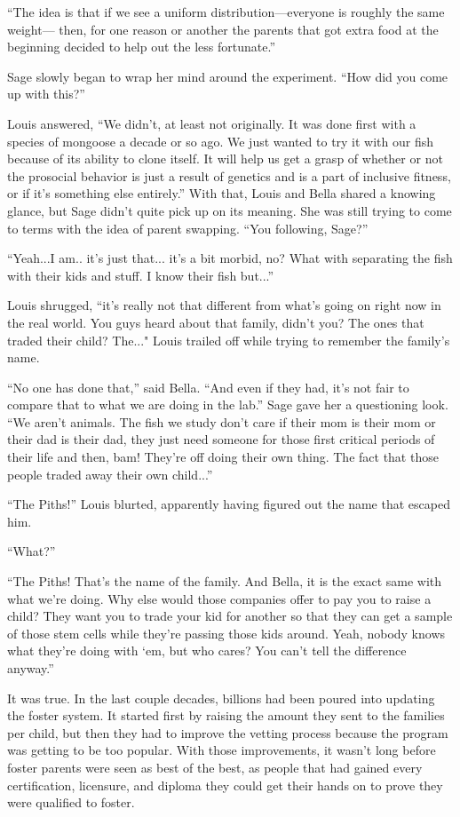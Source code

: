 \documentclass[12pt, fleqn, AofM.tex]{subfiles}
\begin{document}
“The idea is that if we see a uniform distribution—everyone is roughly the same weight— then, for one reason or another the parents that got extra food at the beginning decided to help out the less fortunate.”

Sage slowly began to wrap her mind around the experiment. “How did you come up with this?”

Louis answered, “We didn't, at least not originally. It was done first with a species of mongoose a decade or so ago. We just wanted to try it with our fish because of its ability to clone itself. It will help us get a grasp of whether or not the prosocial behavior is just a result of genetics and is a part of inclusive fitness, or if it's something else entirely.” With that, Louis and Bella shared a knowing glance, but Sage didn't quite pick up on its meaning. She was still trying to come to terms with the idea of parent swapping. “You following, Sage?”

“Yeah...I am.. it's just that... it's a bit morbid, no? What with separating the fish with their kids and stuff. I know their fish but...”

Louis shrugged, “it's really not that different from what's going on right now in the real world. You guys heard about that family, didn't you? The ones that traded their child? The..." Louis trailed off while trying to remember the family's name.

“No one has done that,” said Bella. “And even if they had, it's not fair to compare that to what we are doing in the lab.” Sage gave her a questioning look. “We aren't animals. The fish we study don't care if their mom is their mom or their dad is their dad, they just need someone for those first critical periods of their life and then, bam! They're off doing their own thing. The fact that those people traded away their own child...”

“The Piths!” Louis blurted, apparently having figured out the name that escaped him. 

“What?”

“The Piths! That's the name of the family. And Bella, it is the exact same with what we're doing. Why else would those companies offer to pay you to raise a child? They want you to trade your kid for another so that they can get a sample of those stem cells while they're passing those kids around. Yeah, nobody knows what they're doing with ‘em, but who cares? You can't tell the difference anyway.”

It was true. In the last couple decades, billions had been poured into updating the foster system. It started first by raising the amount they sent to the families per child, but then they had to improve the vetting process because the program was getting to be too popular. With those improvements, it wasn't long before foster parents were seen as best of the best, as people that had gained every certification, licensure, and diploma they could get their hands on to prove they were qualified to foster. 
\end{document}
